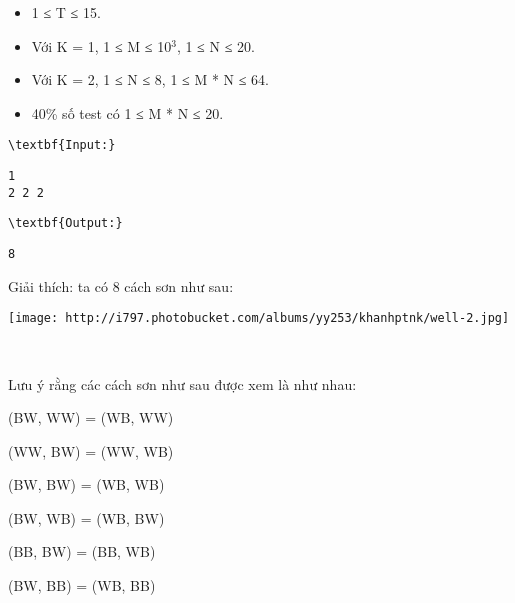\begin{itemize}
	\item 1 ≤ T ≤ 15.
	\item Với K = 1, 1 ≤ M ≤ 10$^3$, 1 ≤ N ≤ 20. 
	\item Với K = 2, 1 ≤ N ≤ 8, 1 ≤ M * N ≤ 64.
	\item 40\% số test có 1 ≤ M * N ≤ 20.
\end{itemize}
\begin{verbatim}
\textbf{Input:}\end{verbatim}
\begin{verbatim}
1
2 2 2\end{verbatim}
\begin{verbatim}
\textbf{Output:}\end{verbatim}
\begin{verbatim}
8\end{verbatim}

Giải thích: ta có 8 cách sơn như sau:


\texttt{[image: http://i797.photobucket.com/albums/yy253/khanhptnk/well-2.jpg]}

 

Lưu ý rằng các cách sơn như sau được xem là như nhau:

(BW, WW) = (WB, WW)

(WW, BW) = (WW, WB)

(BW, BW) = (WB, WB)

(BW, WB) = (WB, BW)

(BB, BW) = (BB, WB)

(BW, BB) = (WB, BB)